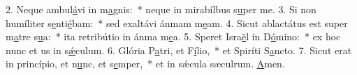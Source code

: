 2. Neque ambul\uline{á}vi in m\uline{a}gnis:~* neque in mirabílbus s\uline{u}per me.
3. Si non humíliter s\uline{e}nti\uline{é}bam:~* sed exaltávi ánmam m\uline{e}am.
4. Sicut ablactátus est super m\uline{a}tre s\uline{u}a:~* ita retribútio in ánma m\uline{e}a.
5. Speret Isra\uline{ë}l in D\uline{ó}mino:~* ex hoc nunc et us in s\uline{ǽ}culum.
6. Glória P\uline{a}tri, et F\uline{í}lio,~* et Spiríti S\uline{a}ncto.
7. Sicut erat in princípio, et n\uline{u}nc, et s\uline{e}mper,~* et in sǽcula sæculrum. \uline{A}men.
